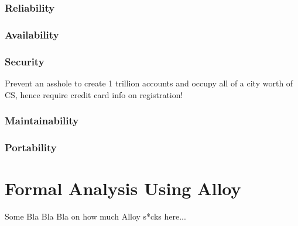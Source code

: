 \documentclass[11pt]{article}
\def\code#1{{\texttt{#1}}}
\begin{document}
\subsubsection{Reliability}

\subsubsection{Availability}

\subsubsection{Security}

Prevent an asshole to create 1 trillion accounts and occupy all of a city worth of CS, hence require credit card info on registration!

\subsubsection{Maintainability}

\subsubsection{Portability}

\section{Formal Analysis Using Alloy}
\label{section:alloy}

Some Bla Bla Bla on how much Alloy s*cks here...

\end{document}
